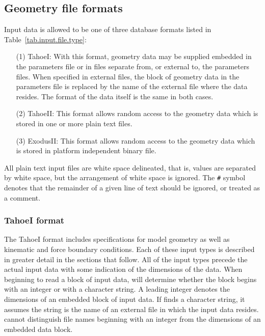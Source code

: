 \subsection{Geometry file formats}
\label{sect.file.geometry}
Input data is allowed to be one of three database formats listed in
Table~\ref{tab.input.file.type}: 
\begin{itemize}
\item[(1)] TahoeI: With this format, geometry data may be supplied 
embedded in the parameters file or in files separate from, or external 
to, the parameters files. When specified in external files, the block 
of geometry data in the parameters file is replaced by the name of 
the external file where the data resides. The format of the data 
itself is the same in both cases.
\item[(2)] TahoeII: This format allows random access to the geometry 
data which is stored in one or more plain text files.
\item[(3)] \textsf{ExodusII}: 
This format allows random access to the geometry 
data which is stored in platform independent binary file.
\end{itemize}
All \tahoe plain text input files are white space delineated, that is, 
values are separated by white space, but the arrangement of white space
is ignored.
The \texttt{\#} symbol denotes that the remainder of a given line of text 
should be ignored, or treated as a comment.

\subsubsection{TahoeI format}
\label{sect.file.tahoeI}
The TahoeI format includes specifications for model geometry as well 
as kinematic and force boundary conditions. Each of these input types 
is described in greater detail in the sections that follow. All of the 
input types precede the actual input data with some indication of the 
dimensions of the data. When beginning to read a block of input data,
\tahoe will determine whether the block begins with an integer or
with a character string.
A leading integer denotes the dimensions of an embedded block of
input data. If \tahoe finds a character string, it assumes the string 
is the name of an external file in which the input data resides. 
\tahoe cannot distinguish file names beginning with an integer from 
the dimensions of an embedded data block.

